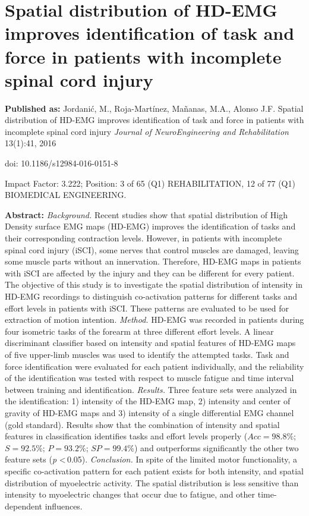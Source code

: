 \chapter[Myoelectric patterns for task identification in patients with iSCI]{Spatial distribution of HD-EMG improves identification of task and force in patients with incomplete spinal cord injury }
\label{ch:p1}
\textbf{Published as:} 
Jordanić, M., Roja-Martínez,  Ma\~nanas, M.A., Alonso J.F.
Spatial distribution of HD-EMG improves identification of task and force in patients with incomplete spinal cord injury \textit{Journal of NeuroEngineering and Rehabilitation} 13(1):41, 2016

doi: 10.1186/s12984-016-0151-8

Impact Factor: 3.222; Position: 3 of 65 (Q1) REHABILITATION, 12 of 77 (Q1) BIOMEDICAL ENGINEERING.


\textbf{Abstract:} \textit{Background.} Recent studies show that spatial distribution of High Density surface EMG maps (HD-EMG) improves the identification of tasks and their corresponding contraction levels. However, in patients with incomplete spinal cord injury (iSCI), some nerves that control muscles are damaged, leaving some muscle parts without an innervation.
Therefore, HD-EMG maps in patients with iSCI are affected by the injury and they can be different for every patient.
The objective of this study is to investigate the spatial distribution of intensity in HD-EMG recordings to distinguish
co-activation patterns for different tasks and effort levels in patients with iSCI. These patterns are evaluated to be used
for extraction of motion intention. \textit{Method.} HD-EMG was recorded in patients during four isometric tasks of the forearm at three different effort levels. A linear discriminant classifier based on intensity and spatial features of HD-EMG maps of five upper-limb muscles was used to identify the attempted tasks. Task and force identification were evaluated for each patient individually,
and the reliability of the identification was tested with respect to muscle fatigue and time interval between training and identification. \textit{Results.} Three feature sets were analyzed in the identification: 1) intensity of the HD-EMG map, 2) intensity and center of gravity of HD-EMG maps and 3) intensity of a single differential EMG channel (gold standard). Results show that the combination of intensity and spatial features in classification identifies tasks and effort levels properly ($Acc = 98.8\%$; $S = 92.5\%$; $P = 93.2\%$; $SP = 99.4\%$) and outperforms significantly the other two feature sets (\textit{p} \textless \,0.05). \textit{Conclusion.} In spite of the limited motor functionality, a specific co-activation pattern for each patient exists for both intensity, and spatial distribution of myoelectric activity. The spatial distribution is less sensitive than intensity to myoelectric changes that occur due to fatigue, and other time-dependent influences.

